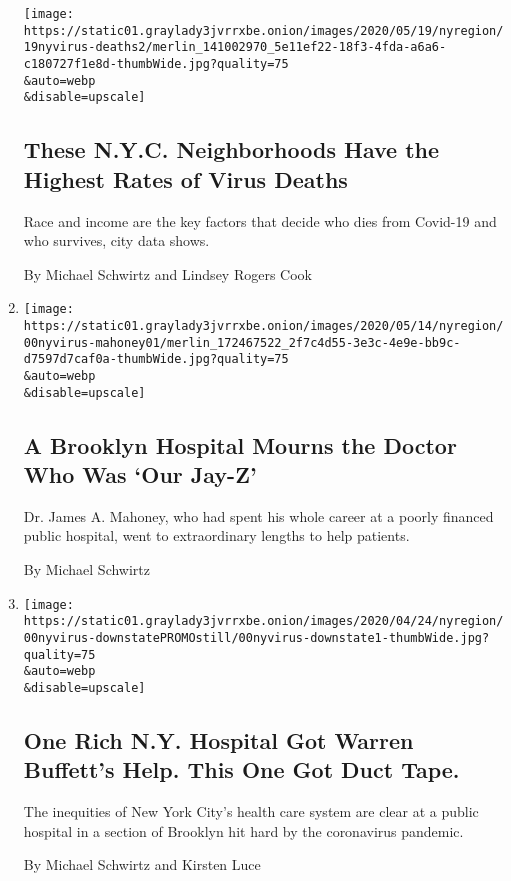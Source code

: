 \begin{enumerate}
  \texttt{[image: https://static01.graylady3jvrrxbe.onion/images/2020/05/19/nyregion/19nyvirus-deaths2/merlin\_141002970\_5e11ef22-18f3-4fda-a6a6-c180727f1e8d-thumbWide.jpg?quality=75\\\&auto=webp\\\&disable=upscale]}

  \hypertarget{these-nyc-neighborhoods-have-the-highest-rates-of-virus-deaths}{%
  \subsection{These N.Y.C. Neighborhoods Have the Highest Rates of Virus
  Deaths}\label{these-nyc-neighborhoods-have-the-highest-rates-of-virus-deaths}}

  Race and income are the key factors that decide who dies from Covid-19
  and who survives, city data shows.

  By Michael Schwirtz and Lindsey Rogers Cook
\item
  \href{/2020/05/18/nyregion/doctor-dies-coronavirus-james-mahoney.html}{}

  \texttt{[image: https://static01.graylady3jvrrxbe.onion/images/2020/05/14/nyregion/00nyvirus-mahoney01/merlin\_172467522\_2f7c4d55-3e3c-4e9e-bb9c-d7597d7caf0a-thumbWide.jpg?quality=75\\\&auto=webp\\\&disable=upscale]}

  \hypertarget{a-brooklyn-hospital-mourns-the-doctor-who-was-our-jay-z}{%
  \subsection{A Brooklyn Hospital Mourns the Doctor Who Was `Our
  Jay-Z'}\label{a-brooklyn-hospital-mourns-the-doctor-who-was-our-jay-z}}

  Dr. James A. Mahoney, who had spent his whole career at a poorly
  financed public hospital, went to extraordinary lengths to help
  patients.

  By Michael Schwirtz
\item
  \href{/2020/04/26/nyregion/coronavirus-new-york-university-hospital.html}{}

  \texttt{[image: https://static01.graylady3jvrrxbe.onion/images/2020/04/24/nyregion/00nyvirus-downstatePROMOstill/00nyvirus-downstate1-thumbWide.jpg?quality=75\\\&auto=webp\\\&disable=upscale]}

  \hypertarget{one-rich-ny-hospital-got-warren-buffetts-help-this-one-got-duct-tape}{%
  \subsection{One Rich N.Y. Hospital Got Warren Buffett's Help. This One
  Got Duct
  Tape.}\label{one-rich-ny-hospital-got-warren-buffetts-help-this-one-got-duct-tape}}

  The inequities of New York City's health care system are clear at a
  public hospital in a section of Brooklyn hit hard by the coronavirus
  pandemic.

  By Michael Schwirtz and Kirsten Luce
\end{enumerate}

